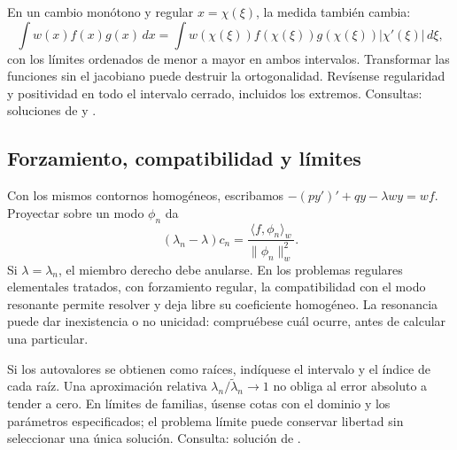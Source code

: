 En un cambio monótono y regular $x=\chi(\xi)$, la medida también cambia:
\[
 \int w(x)f(x)g(x)\,dx
 =\int w(\chi(\xi))f(\chi(\xi))g(\chi(\xi))
        |\chi'(\xi)|\,d\xi,
\]
con los límites ordenados de menor a mayor en ambos intervalos.
Transformar las funciones sin el jacobiano puede destruir la
ortogonalidad. Revísense regularidad y positividad en todo el intervalo
cerrado, incluidos los extremos. Consultas: soluciones de
 y .

%
\subsection*{Forzamiento, compatibilidad y límites}
\label{CH09-B04}
Con los mismos contornos homogéneos, escribamos
$-(py')'+qy-\lambda wy=wf$. Proyectar sobre un modo $\phi_n$ da
\[
 (\lambda_n-\lambda)c_n
 =\frac{\langle f,\phi_n\rangle_w}{\|\phi_n\|_w^2}.
\]
Si $\lambda=\lambda_n$, el miembro derecho debe anularse. En los
problemas regulares elementales tratados, con forzamiento regular, la
compatibilidad con el modo resonante permite resolver y deja libre su
coeficiente homogéneo. La resonancia puede dar inexistencia o no
unicidad: compruébese cuál ocurre, antes de calcular una particular.

Si los autovalores se obtienen como raíces, indíquese el intervalo y el
índice de cada raíz. Una aproximación relativa
$\lambda_n/\widetilde\lambda_n\to1$ no obliga al error absoluto a
tender a cero. En límites de familias, úsense cotas con el dominio y los
parámetros especificados; el problema límite puede conservar libertad
sin seleccionar una única solución. Consulta: solución de
.
